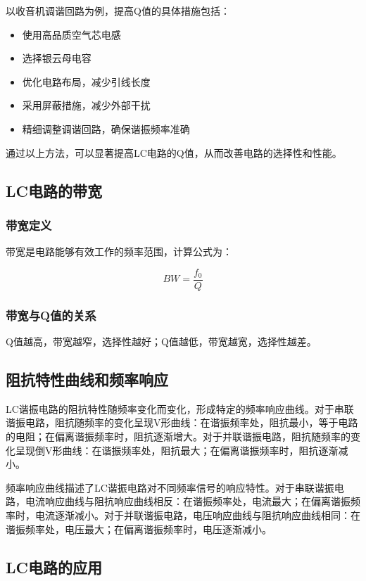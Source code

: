 \documentclass[12pt,UTF8]{ctexbook}
\begin{document}
以收音机调谐回路为例，提高Q值的具体措施包括：

\begin{itemize}[leftmargin=3.5em]
    \item 使用高品质空气芯电感
    \item 选择银云母电容
    \item 优化电路布局，减少引线长度
    \item 采用屏蔽措施，减少外部干扰
    \item 精细调整调谐回路，确保谐振频率准确
\end{itemize}

通过以上方法，可以显著提高LC电路的Q值，从而改善电路的选择性和性能。

\subsection{LC电路的带宽}

\subsubsection{带宽定义}

带宽是电路能够有效工作的频率范围，计算公式为：

\[ BW = \frac{f_0}{Q} \]

\subsubsection{带宽与Q值的关系}

Q值越高，带宽越窄，选择性越好；Q值越低，带宽越宽，选择性越差。

\subsection{阻抗特性曲线和频率响应}

LC谐振电路的阻抗特性随频率变化而变化，形成特定的频率响应曲线。对于串联谐振电路，阻抗随频率的变化呈现V形曲线：在谐振频率处，阻抗最小，等于电路的电阻；在偏离谐振频率时，阻抗逐渐增大。对于并联谐振电路，阻抗随频率的变化呈现倒V形曲线：在谐振频率处，阻抗最大；在偏离谐振频率时，阻抗逐渐减小。

频率响应曲线描述了LC谐振电路对不同频率信号的响应特性。对于串联谐振电路，电流响应曲线与阻抗响应曲线相反：在谐振频率处，电流最大；在偏离谐振频率时，电流逐渐减小。对于并联谐振电路，电压响应曲线与阻抗响应曲线相同：在谐振频率处，电压最大；在偏离谐振频率时，电压逐渐减小。

\subsection{LC电路的应用}
\end{document}
